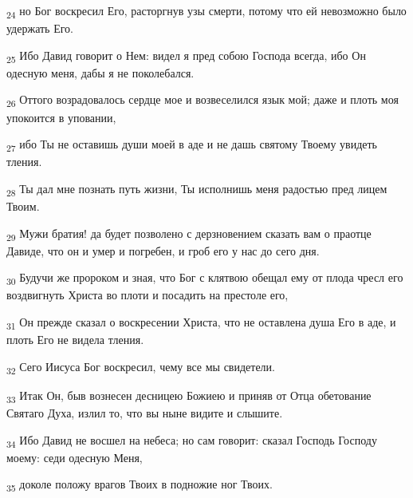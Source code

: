 \begin{tcolorbox}
\textsubscript{24} но Бог воскресил Его, расторгнув узы смерти, потому что ей невозможно было удержать Его.
\end{tcolorbox}
\begin{tcolorbox}
\textsubscript{25} Ибо Давид говорит о Нем: видел я пред собою Господа всегда, ибо Он одесную меня, дабы я не поколебался.
\end{tcolorbox}
\begin{tcolorbox}
\textsubscript{26} Оттого возрадовалось сердце мое и возвеселился язык мой; даже и плоть моя упокоится в уповании,
\end{tcolorbox}
\begin{tcolorbox}
\textsubscript{27} ибо Ты не оставишь души моей в аде и не дашь святому Твоему увидеть тления.
\end{tcolorbox}
\begin{tcolorbox}
\textsubscript{28} Ты дал мне познать путь жизни, Ты исполнишь меня радостью пред лицем Твоим.
\end{tcolorbox}
\begin{tcolorbox}
\textsubscript{29} Мужи братия! да будет позволено с дерзновением сказать вам о праотце Давиде, что он и умер и погребен, и гроб его у нас до сего дня.
\end{tcolorbox}
\begin{tcolorbox}
\textsubscript{30} Будучи же пророком и зная, что Бог с клятвою обещал ему от плода чресл его воздвигнуть Христа во плоти и посадить на престоле его,
\end{tcolorbox}
\begin{tcolorbox}
\textsubscript{31} Он прежде сказал о воскресении Христа, что не оставлена душа Его в аде, и плоть Его не видела тления.
\end{tcolorbox}
\begin{tcolorbox}
\textsubscript{32} Сего Иисуса Бог воскресил, чему все мы свидетели.
\end{tcolorbox}
\begin{tcolorbox}
\textsubscript{33} Итак Он, быв вознесен десницею Божиею и приняв от Отца обетование Святаго Духа, излил то, что вы ныне видите и слышите.
\end{tcolorbox}
\begin{tcolorbox}
\textsubscript{34} Ибо Давид не восшел на небеса; но сам говорит: сказал Господь Господу моему: седи одесную Меня,
\end{tcolorbox}
\begin{tcolorbox}
\textsubscript{35} доколе положу врагов Твоих в подножие ног Твоих.
\end{tcolorbox}
